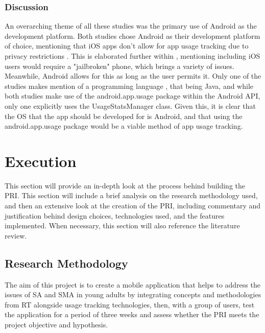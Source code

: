 \documentclass[12pt]{article}
\begin{document}
\subsubsection{Discussion}
An overarching theme of all these studies was the primary use of Android as the development platform. 
Both studies chose Android as their development platform of choice, mentioning that iOS apps don't allow for app 
usage tracking due to privacy restrictions 
\autocite{RefWorks:RefID:118-rosa2022problematic, RefWorks:RefID:116-bye2024cohort, applesupport-ifanappasks}. 
This is elaborated further within \textcite{RefWorks:RefID:123-2024mobile}, mentioning including iOS users 
would require a "jailbroken" phone, which brings a variety of issues. Meanwhile, Android allows for this as 
long as the user permits it. Only one of the studies makes mention of a programming language 
\autocite{RefWorks:RefID:118-rosa2022problematic}, that being Java, and while both studies make use of the
android.app.usage package within the Android API, only one \autocite{RefWorks:RefID:118-rosa2022problematic}
explicitly uses the UsageStatsManager class. Given this, it is clear that the OS that the app 
should be developed for is Android, and that using the android.app.usage package would be a viable method of app 
usage tracking.
\newpage


\section{Execution}
This section will provide an in-depth look at the process behind building the PRI. This section will 
include a brief analysis on the research methodology used, and then an extensive look at the creation of the PRI, including commentary 
and justification behind design choices, technologies used, and the features implemented. When necessary, this
section will also reference the literature review.

\subsection{Research Methodology}
The aim of this project is to create a mobile application that helps to address the issues of SA and SMA in young adults by integrating concepts and methodologies from RT alongside usage 
tracking technologies, then, with a group of users, test the application for a period of three weeks and assess whether the PRI meets the project objective and hypothesis.\newline
\end{document}
